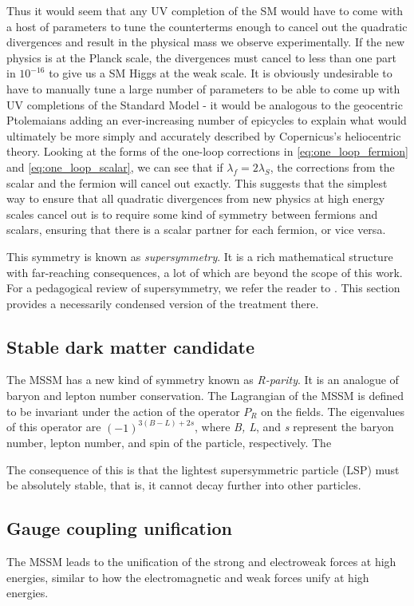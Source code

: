 Thus it would seem that any UV completion of the SM would have to come with a host of parameters to tune the counterterms enough to cancel out the quadratic divergences and result in the physical mass we observe experimentally. If the new physics is at the Planck scale, the divergences must cancel to less than one part in $10^{-16}$ to give us a SM Higgs at the weak scale.
It is obviously undesirable to have to manually tune a large number of parameters to be able to come up with UV completions of the Standard Model - it would be analogous to the geocentric Ptolemaians adding an ever-increasing number of epicycles to explain what would ultimately be more simply and accurately described by Copernicus's heliocentric theory. 
Looking at the forms of the one-loop corrections in \autoref{eq:one_loop_fermion} and \autoref{eq:one_loop_scalar}, we can see that if $\lambda_f = 2\lambda_S$, the corrections from the scalar and the fermion will cancel out exactly. This suggests that the simplest way to ensure that all quadratic divergences from new physics at high energy scales cancel out is to require some kind of symmetry between fermions and scalars, ensuring that there is a scalar partner for each fermion, or vice versa.

This symmetry is known as \emph{supersymmetry}. It is a rich mathematical structure with far-reaching consequences, a lot of which are beyond the scope of this work. For a pedagogical review of supersymmetry, we refer the reader to \citep{Martin1997}. This section provides a necessarily condensed version of the treatment there.

\subsection{Stable dark matter candidate}
The MSSM has a new kind of symmetry known as \emph{R-parity}. It is an analogue of baryon and lepton number conservation. The Lagrangian of the MSSM is defined to be invariant under the action of the operator $P_R$ on the fields. The eigenvalues of this operator are $(-1)^{3(B-L)+2s}$, where \emph{B, L}, and \emph{s} represent the baryon number, lepton number, and spin of the particle, respectively. The  

The consequence of this is that the lightest supersymmetric particle (LSP) must be absolutely stable, that is, it cannot decay further into other particles.
\subsection{Gauge coupling unification}
The MSSM leads to the unification of the strong and electroweak forces at high energies, similar to how the electromagnetic and weak forces unify at high energies.

